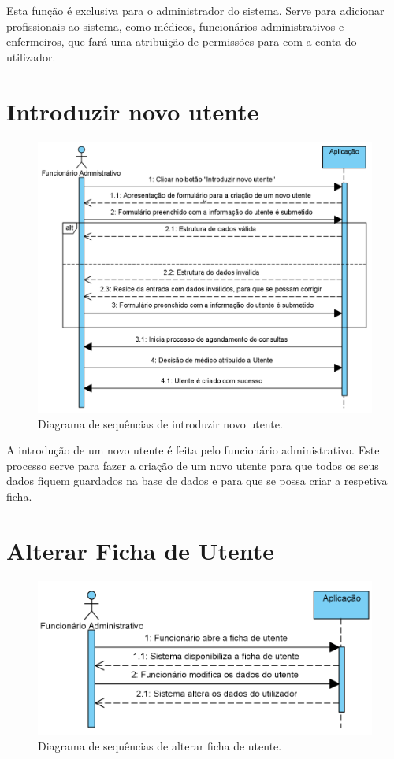 \documentclass[11pt,a4paper,twoside]{report}
\begin{document}
Esta função é exclusiva para o administrador do sistema.
Serve para adicionar profissionais ao sistema, como médicos, funcionários administrativos e enfermeiros, que fará uma atribuição de permissões para com a conta do utilizador. 

\section{Introduzir novo utente}

\begin{figure}[H]
	\centering
	\includegraphics[width=0.7\linewidth]{image/SequencialDiagramsImages/Introduzir_novo_utente}
	\caption [Diagrama de sequências de introduzir novo utente.] {Diagrama de sequências de introduzir novo utente.}
	\label{fig:introduzirnovoutenteF}
\end{figure}

A introdução de um novo utente é feita pelo funcionário administrativo.
Este processo serve para fazer a criação de um novo utente para que todos os seus dados fiquem guardados na base de dados e para que se possa criar a respetiva ficha. 

\section{Alterar Ficha de Utente}

\begin{figure}[H]
	\centering
	\includegraphics[width=0.7\linewidth]{image/SequencialDiagramsImages/Alterar_ficha_utente}
	\caption [Diagrama de sequências de alterar ficha de utente.] {Diagrama de sequências de alterar ficha de utente.}
	\label{fig:alterarfichautenteF}
\end{figure}
\end{document}
